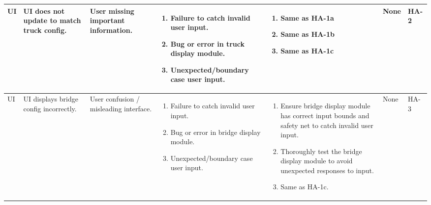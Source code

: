 \documentclass{article}
\begin{document}
\begin{landscape}
\begin{longtable}{|p{} | p{} | p{} | p{} | p{} | p{} | p{}|}
  UI & UI does not update to match truck config. & User missing important information. & 
  \begin{enumerate}[leftmargin=*, label={\alph*.}, itemsep=1pt, topsep=0pt, partopsep=0pt] 
    \item Failure to catch invalid user input.
    \item Bug or error in truck display module.
    \item Unexpected/boundary case user input.
  \end{enumerate} &
  \begin{enumerate}[leftmargin=*, label={\alph*.}, itemsep=1pt, topsep=0pt, partopsep=0pt] 
    \item Same as HA-1a
    \item Same as HA-1b
    \item Same as HA-1c
  \end{enumerate} & 
  None & HA-2 \\

  \hline

  UI & UI displays bridge config incorrectly. & User confusion / misleading interface. &
  \begin{enumerate}[leftmargin=*, label={\alph*.}, itemsep=1pt, topsep=0pt, partopsep=0pt] 
    \item Failure to catch invalid user input.
    \item Bug or error in bridge display module.
    \item Unexpected/boundary case user input.
  \end{enumerate} &
  \begin{enumerate}[leftmargin=*, label={\alph*.}, itemsep=1pt, topsep=0pt, partopsep=0pt] 
    \item Ensure bridge display module has correct input bounds and safety net to catch invalid user input.
    \item Thoroughly test the bridge display module to avoid unexpected responses to input.
    \item Same as HA-1c.
  \end{enumerate} & 
  None & HA-3 \\

  \hline


\end{longtable}
\end{landscape}
\end{document}
